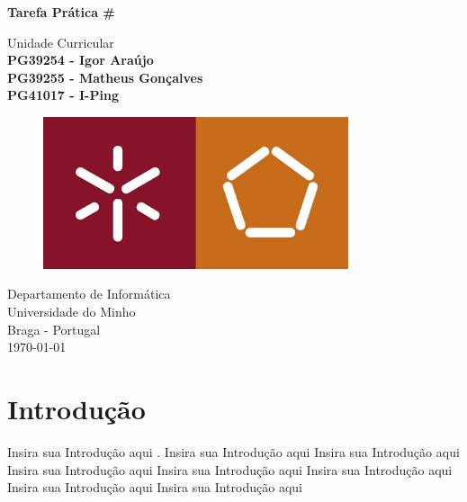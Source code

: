 \documentclass{llncs}
\begin{document}
\begin{titlepage}           
\end{titlepage}
\begin{titlepage}
  \begin{center}
    \vspace*{1cm}
    \Huge
    \textbf{Tarefa Prática \#}
    \vspace{0.5cm}
    
    \LARGE
    Unidade Curricular
    \vspace{1.0cm}
    \small
    \textbf{\\PG39254 - Igor Araújo\\PG39255 - Matheus Gonçalves\\PG41017 - I-Ping}
    
    \vspace{1.0cm}
    \begin{figure}[ht]
    \includegraphics[width=0.8\textwidth]{uminho.jpg}
    \centering
    \end{figure}
    
    \vspace{4.5cm}
    Departamento de Informática\\
    Universidade do Minho\\
    Braga - Portugal\\
    \today
          
  \end{center}
\end{titlepage}

\tableofcontents

\clearpage

\section{Introdução}

%
Insira sua Introdução aqui  \cite{castro}. Insira sua Introdução aqui  Insira sua Introdução aqui   Insira sua Introdução aqui \cite{racket}   Insira sua Introdução aqui   Insira sua Introdução aqui   Insira sua Introdução aqui \cite{deb:agra}   Insira sua Introdução aqui  
\end{document}
